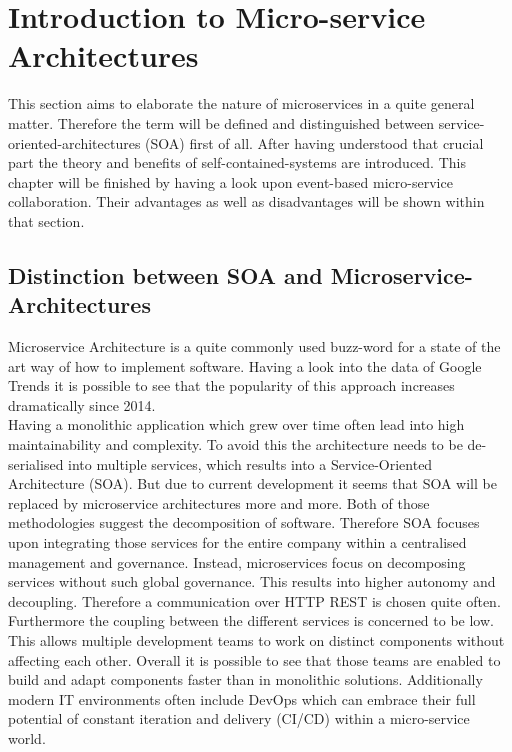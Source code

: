 \section{Introduction to Micro-service Architectures}
\label{sec:techKnowHow}
This section aims to elaborate the nature of microservices in a quite general matter. Therefore the term will be defined and distinguished between service-oriented-architectures (SOA) first of all. After having understood that crucial part the theory and benefits of self-contained-systems are introduced. This chapter will be finished by having a look upon event-based micro-service collaboration. Their advantages as well as disadvantages will be shown within that section. 

\subsection{Distinction between SOA and Microservice-Architectures}
Microservice Architecture is a quite commonly used buzz-word for a state of the art way of how to implement software. Having a look into the data of Google Trends it is possible to see that the popularity of this approach increases dramatically since 2014. \cite{microservices}\newline
\\
Having a monolithic application which grew over time often lead into high maintainability and complexity. To avoid this the architecture needs to be de-serialised into multiple services, which results into a Service-Oriented Architecture (SOA). But due to current development it seems that SOA will be replaced by microservice architectures more and more.\cite{mircorVSsoa}\newline
Both of those methodologies suggest the decomposition of software. Therefore SOA focuses upon integrating those services for the entire company within a centralised management and governance. Instead, microservices focus on decomposing services without such global governance. This results into higher autonomy and decoupling.\cite{mircorVSsoa} Therefore a communication over HTTP REST is chosen quite often.\newline
Furthermore the coupling between the different services is concerned to be low. This allows multiple development teams to work on distinct components without affecting each other. Overall it is possible to see that those teams are enabled to build and adapt components faster than in monolithic solutions. Additionally  modern IT environments often include DevOps which can embrace their full potential of constant iteration and delivery (CI/CD) within a micro-service world. \cite{redHatMicroservices}\newline
